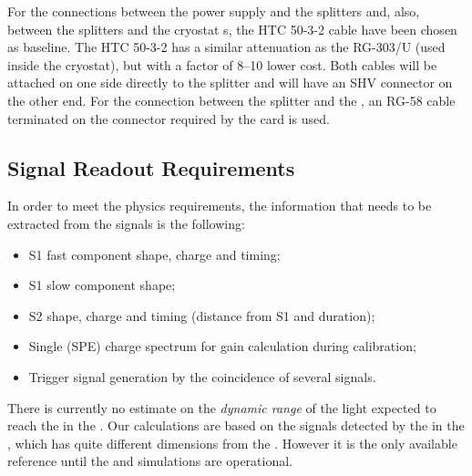 For the connections between the  power supply and the splitters and, also, between the splitters and the cryostat \fdth{}s, the HTC 50-3-2 cable have been chosen as baseline. The HTC 50-3-2 has a similar attenuation %
as the RG-303/U (used inside the cryostat), but with a factor of \numrange{8}{10} lower cost. Both cables will be attached on one side directly to the  splitter and will have an SHV connector on the other end. For the connection between the splitter and the , an RG-58 cable %
terminated on the connector required by the  card is used.

\subsection{Signal Readout Requirements}
\label{sec:fddp-pd-4.3}

In order to meet the physics requirements, the information that needs to be extracted from the  signals is the following:

\begin{itemize}
\item S1 fast component shape, charge and timing;
\item S1 slow component shape;
\item S2 shape, charge and timing (distance from S1 and duration);
\item Single \phel (SPE) charge spectrum for gain calculation during  calibration;
\item Trigger signal generation by the coincidence of several  signals.
\end{itemize}

There is currently no estimate on the \textit{dynamic range} of the light expected to reach the  in the . Our calculations are based on the signals detected by the  in the , %
which has quite different dimensions from the . However it is the only available reference %
until the  and simulations are operational.

